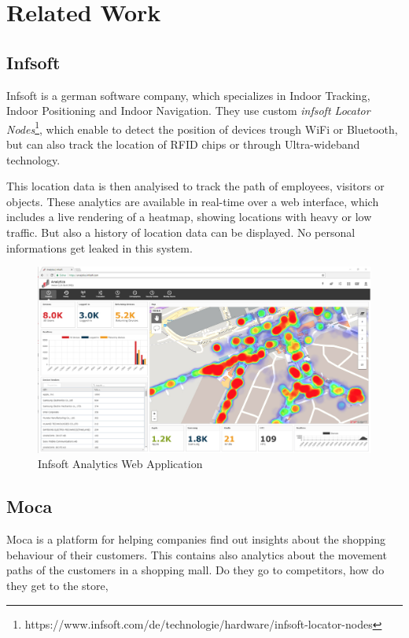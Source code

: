 \section{Related Work}

\subsection{Infsoft}

Infsoft is a german software company, which specializes in Indoor Tracking, Indoor Positioning and Indoor Navigation. They use custom \emph{infsoft Locator Nodes}\footnote{https://www.infsoft.com/de/technologie/hardware/infsoft-locator-nodes}, which enable to detect the position of devices trough WiFi or Bluetooth, but can also track the location of RFID chips or through Ultra-wideband technology.

This location data is then analyised to track the path of employees, visitors or objects. These analytics are available in real-time over a web interface, which includes a live rendering of a heatmap, showing locations with heavy or low traffic. But also a history of location data can be displayed.
No personal informations get leaked in this system.

\begin{figure}[!hb]
	\centering
	\includegraphics[width=0.9\linewidth]{images/Infsoft}
	\caption{Infsoft Analytics Web Application}
	\label{fig:InfsoftApplication}
\end{figure}

\subsection{Moca}

Moca is a platform for helping companies find out insights about the shopping behaviour of their customers. This contains also analytics about the movement paths of the customers in a shopping mall. Do they go to competitors, how do they get to the store,


